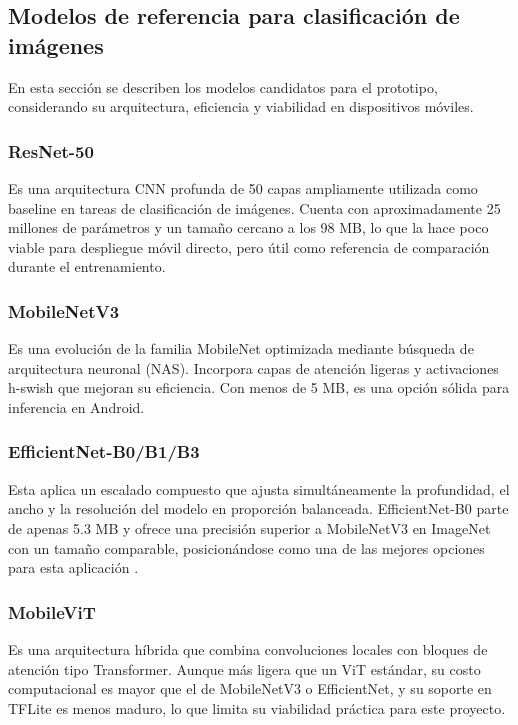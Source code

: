\subsection{Modelos de referencia para clasificación de imágenes}

En esta sección se describen los modelos candidatos para el prototipo, considerando su arquitectura, eficiencia y viabilidad en dispositivos móviles.

\subsubsection{ResNet-50}
Es una arquitectura CNN profunda de 50 capas ampliamente utilizada como baseline en tareas de clasificación de imágenes. Cuenta con aproximadamente 25 millones de parámetros y un tamaño cercano a los 98 MB, lo que la hace poco viable para despliegue móvil directo, pero útil como referencia de comparación durante el entrenamiento.
\subsubsection{MobileNetV3}
Es una evolución de la familia MobileNet optimizada mediante búsqueda de arquitectura neuronal (NAS). Incorpora capas de atención ligeras y activaciones h-swish que mejoran su eficiencia. Con menos de 5 MB, es una opción sólida para inferencia en Android.

\subsubsection{EfficientNet-B0/B1/B3} 
Esta aplica un escalado compuesto que ajusta simultáneamente la profundidad, el ancho y la resolución del modelo en proporción balanceada. EfficientNet-B0 parte de apenas 5.3 MB y ofrece una precisión superior a MobileNetV3 en ImageNet con un tamaño comparable, posicionándose como una de las mejores opciones para esta aplicación \cite{Tan2019EfficientNetRM}.

\subsubsection{MobileViT} 
Es una arquitectura híbrida que combina convoluciones locales con bloques de atención tipo Transformer. Aunque más ligera que un ViT estándar, su costo computacional es mayor que el de MobileNetV3 o EfficientNet, y su soporte en TFLite es menos maduro, lo que limita su viabilidad práctica para este proyecto.